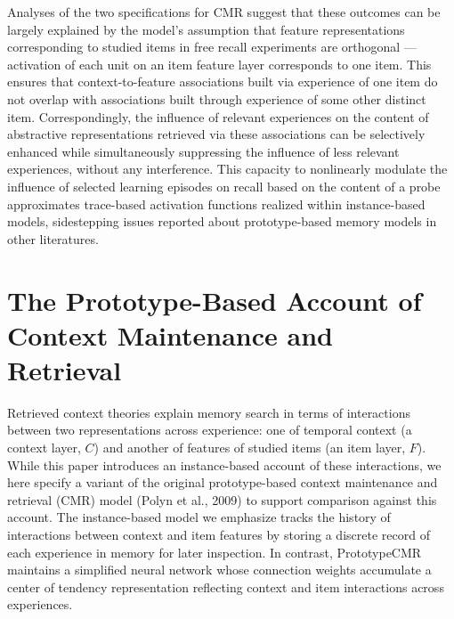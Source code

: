 \documentclass[
  letterpaper,
]{article}
\begin{document}
Analyses of the two specifications for CMR suggest that these outcomes
can be largely explained by the model's assumption that feature
representations corresponding to studied items in free recall
experiments are orthogonal --- activation of each unit on an item
feature layer corresponds to one item. This ensures that
context-to-feature associations built via experience of one item do not
overlap with associations built through experience of some other
distinct item. Correspondingly, the influence of relevant experiences on
the content of abstractive representations retrieved via these
associations can be selectively enhanced while simultaneously
suppressing the influence of less relevant experiences, without any
interference. This capacity to nonlinearly modulate the influence of
selected learning episodes on recall based on the content of a probe
approximates trace-based activation functions realized within
instance-based models, sidestepping issues reported about
prototype-based memory models in other literatures.

\hypertarget{the-prototype-based-account-of-context-maintenance-and-retrieval}{%
\section{The Prototype-Based Account of Context Maintenance and
Retrieval}\label{the-prototype-based-account-of-context-maintenance-and-retrieval}}

Retrieved context theories explain memory search in terms of
interactions between two representations across experience: one of
temporal context (a context layer, \(C\)) and another of features of
studied items (an item layer, \(F\)). While this paper introduces an
instance-based account of these interactions, we here specify a variant
of the original prototype-based context maintenance and retrieval (CMR)
model (Polyn et al., 2009) to support comparison against this account.
The instance-based model we emphasize tracks the history of interactions
between context and item features by storing a discrete record of each
experience in memory for later inspection. In contrast, PrototypeCMR
maintains a simplified neural network whose connection weights
accumulate a center of tendency representation reflecting context and
item interactions across experiences.
\end{document}
